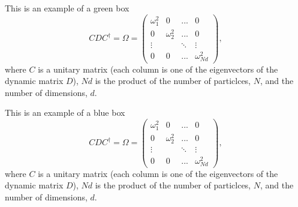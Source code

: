 \documentclass{article}
\begin{document}
\begin{greenbox}{This is an example of a green box}
	\begin{equation*}
			C D C^{\dagger} = \Omega = \left(\begin{array}{cccc}
				\omega^2_1 & 0 & ... & 0\\
				0 & \omega^2_2 & ... & 0\\
				\vdots &  & \ddots & \vdots \\
				0 & 0 & ... & \omega^2_{Nd}
			\end{array}\right),
	\end{equation*}
	where $C$ is a unitary matrix (each column is one of the eigenvectors of the dynamic matrix $D$), $Nd$ is the product of the number of particlces, $N$, and the number of dimensions, $d$.
\end{greenbox}

\begin{bluebox}{This is an example of a blue box}
	\begin{equation*}
			C D C^{\dagger} = \Omega = \left(\begin{array}{cccc}
				\omega^2_1 & 0 & ... & 0\\
				0 & \omega^2_2 & ... & 0\\
				\vdots &  & \ddots & \vdots \\
				0 & 0 & ... & \omega^2_{Nd}
			\end{array}\right),
	\end{equation*}
	where $C$ is a unitary matrix (each column is one of the eigenvectors of the dynamic matrix $D$), $Nd$ is the product of the number of particlces, $N$, and the number of dimensions, $d$.
\end{bluebox}
\end{document}
